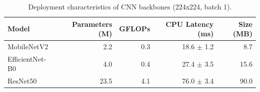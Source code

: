 \begin{table}[h]
\centering
\caption{Deployment characteristics of CNN backbones (224x224, batch 1).}
\label{tab:deployment}
\begin{tabular}{lrrrr}
\toprule
Model & Parameters (M) & GFLOPs & CPU Latency (ms) & Size (MB) \\
\midrule
MobileNetV2 & 2.2 & 0.3 & 18.6 $\pm$ 1.2 & 8.7 \\
EfficientNet-B0 & 4.0 & 0.4 & 27.4 $\pm$ 3.5 & 15.6 \\
ResNet50 & 23.5 & 4.1 & 76.0 $\pm$ 3.4 & 90.0 \\
\bottomrule
\end{tabular}
\end{table}
